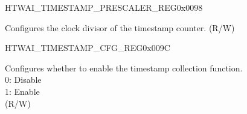 \begin{register}{H}{TWAI\_TIMESTAMP\_PRESCALER\_REG}{0x0098}\label{regdesc:TWAITIMESTAMPPRESCALERREG}
%
%
\regnewline%
\begin{regdesc}\begin{reglist}
\label{fielddesc:TWAITSDIVNUM}\item [TWAI\_TS\_DIV\_NUM] Configures the clock  divisor of the timestamp counter. (R/W)
\end{reglist}\end{regdesc}
\end{register}


\begin{register}{H}{TWAI\_TIMESTAMP\_CFG\_REG}{0x009C}\label{regdesc:TWAITIMESTAMPCFGREG}
%
%
\regnewline%
\begin{regdesc}\begin{reglist}
\label{fielddesc:TWAITSENABLE}\item [TWAI\_TS\_ENABLE] Configures whether to enable the timestamp collection function.\\
0: Disable\\
1: Enable\\
(R/W)
\end{reglist}\end{regdesc}
\end{register}
